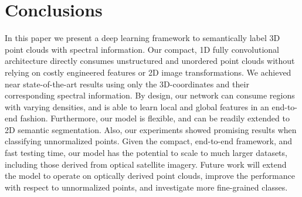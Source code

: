 \documentclass[final,3p,times,twocolumn,authoryear]{elsarticle}
\begin{document}





\section{Conclusions}
\label{sec:conclusions}
In this paper we present a deep learning framework to semantically label 3D point clouds with spectral information. 
Our compact, 1D fully convolutional architecture directly consumes unstructured and unordered point clouds without relying on costly engineered features or 2D image transformations. 
We achieved near state-of-the-art results using only the 3D-coordinates and their corresponding spectral information. 
By design, our network can consume regions with varying densities, and is able to learn local and global features in an end-to-end fashion. 
Furthermore, our model is flexible, and can be readily extended to 2D semantic segmentation. 
Also, our experiments showed promising results when classifying unnormalized points. 
Given the compact, end-to-end framework, and fast testing time, our model has the potential to scale to much larger datasets, including those derived from optical satellite imagery.
Future work will extend the model to operate on optically derived point clouds, improve the performance with respect to  unnormalized points, and investigate more fine-grained classes. 
\end{document}
